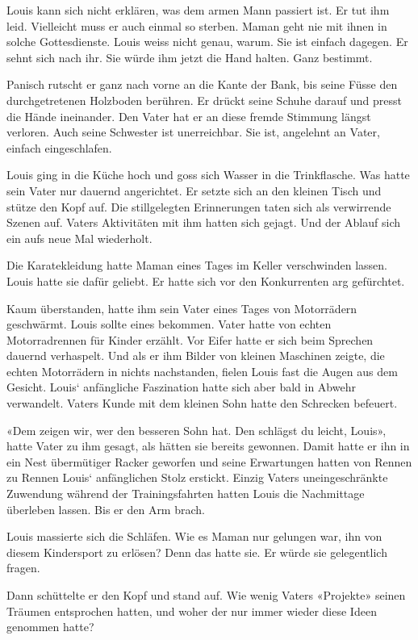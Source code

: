 Louis kann sich nicht erklären, was dem armen Mann passiert ist. Er tut
ihm leid. Vielleicht muss er auch einmal so sterben. Maman geht nie mit
ihnen in solche Gottesdienste. Louis weiss nicht genau, warum. Sie ist
einfach dagegen. Er sehnt sich nach ihr. Sie würde ihm jetzt die Hand
halten. Ganz bestimmt.

Panisch rutscht er ganz nach vorne an die Kante der Bank, bis seine
Füsse den durchgetretenen Holzboden berühren. Er drückt seine Schuhe
darauf und presst die Hände ineinander. Den Vater hat er an diese fremde
Stimmung längst verloren. Auch seine Schwester ist unerreichbar. Sie
ist, angelehnt an Vater, einfach eingeschlafen.

Louis ging in die Küche hoch und goss sich Wasser in die Trinkflasche.
Was hatte sein Vater nur dauernd angerichtet. Er setzte sich an den
kleinen Tisch und stütze den Kopf auf. Die stillgelegten Erinnerungen
taten sich als verwirrende Szenen auf. Vaters Aktivitäten mit ihm hatten
sich gejagt. Und der Ablauf sich ein aufs neue Mal wiederholt.

Die Karatekleidung hatte Maman eines Tages im Keller verschwinden
lassen. Louis hatte sie dafür geliebt. Er hatte sich vor den
Konkurrenten arg gefürchtet.

Kaum überstanden, hatte ihm sein Vater eines Tages von Motorrädern
geschwärmt. Louis sollte eines bekommen. Vater hatte von echten
Motorradrennen für Kinder erzählt. Vor Eifer hatte er sich beim Sprechen
dauernd verhaspelt. Und als er ihm Bilder von kleinen Maschinen zeigte,
die echten Motorrädern in nichts nachstanden, fielen Louis fast die
Augen aus dem Gesicht. Louis` anfängliche Faszination hatte sich aber
bald in Abwehr verwandelt. Vaters Kunde mit dem kleinen Sohn hatte den
Schrecken befeuert.

«Dem zeigen wir, wer den besseren Sohn hat. Den schlägst du leicht,
Louis», hatte Vater zu ihm gesagt, als hätten sie bereits gewonnen.
Damit hatte er ihn in ein Nest übermütiger Racker geworfen und seine
Erwartungen hatten von Rennen zu Rennen Louis` anfänglichen Stolz
erstickt. Einzig Vaters uneingeschränkte Zuwendung während der
Trainingsfahrten hatten Louis die Nachmittage überleben lassen. Bis er
den Arm brach.

Louis massierte sich die Schläfen. Wie es Maman nur gelungen war, ihn
von diesem Kindersport zu erlösen? Denn das hatte sie. Er würde sie
gelegentlich fragen.

Dann schüttelte er den Kopf und stand auf. Wie wenig Vaters «Projekte»
seinen Träumen entsprochen hatten, und woher der nur immer wieder diese
Ideen genommen hatte?

